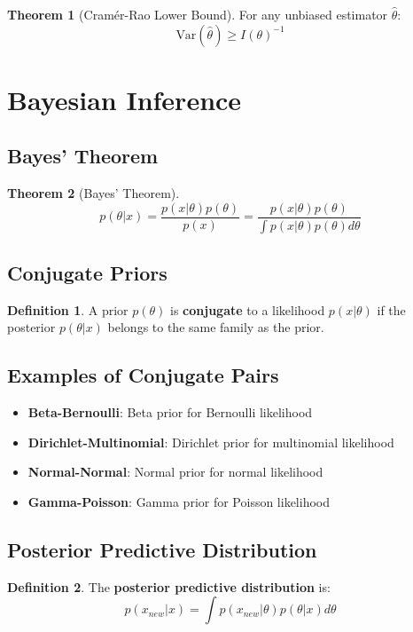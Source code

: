 \documentclass[11pt]{article}
\theoremstyle{definition}
\newtheorem{definition}{Definition}[section]
\newtheorem{theorem}{Theorem}[section]
\begin{document}
\begin{theorem}[Cramér-Rao Lower Bound]
For any unbiased estimator $\hat{\theta}$:
$$\text{Var}(\hat{\theta}) \geq I(\theta)^{-1}$$
\end{theorem}

\section{Bayesian Inference}

\subsection{Bayes' Theorem}
\begin{theorem}[Bayes' Theorem]
$$p(\theta|x) = \frac{p(x|\theta) p(\theta)}{p(x)} = \frac{p(x|\theta) p(\theta)}{\int p(x|\theta) p(\theta) d\theta}$$
\end{theorem}

\subsection{Conjugate Priors}
\begin{definition}
A prior $p(\theta)$ is \textbf{conjugate} to a likelihood $p(x|\theta)$ if the posterior $p(\theta|x)$ belongs to the same family as the prior.
\end{definition}

\subsection{Examples of Conjugate Pairs}
\begin{itemize}
    \item \textbf{Beta-Bernoulli}: Beta prior for Bernoulli likelihood
    \item \textbf{Dirichlet-Multinomial}: Dirichlet prior for multinomial likelihood
    \item \textbf{Normal-Normal}: Normal prior for normal likelihood
    \item \textbf{Gamma-Poisson}: Gamma prior for Poisson likelihood
\end{itemize}

\subsection{Posterior Predictive Distribution}
\begin{definition}
The \textbf{posterior predictive distribution} is:
$$p(x_{new}|x) = \int p(x_{new}|\theta) p(\theta|x) d\theta$$
\end{definition}
\end{document}
